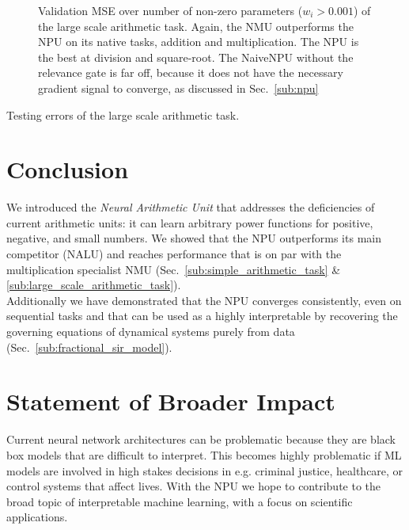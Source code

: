 \documentclass[9pt]{article}
\begin{document}
\begin{figure}
  \centering
  \resizebox{\textwidth}{!}{}
  \caption{Validation MSE over number of non-zero parameters ($w_i > 0.001$) of the large scale
  arithmetic task.  Again, the NMU outperforms the NPU on its
  native tasks, addition and multiplication. The NPU is the best at division
  and square-root.  The NaiveNPU without the relevance gate is far off, because
  it does not have the necessary gradient signal to converge, as discussed in
  Sec.~\ref{sub:npu}}%
  \label{fig:pareto}
\end{figure}

\begin{table}
  \centering
  \caption{Testing errors of the large scale arithmetic task.}
  \label{tab:arithmetic100_val}
  
\end{table}

 
\section{Conclusion}%
\label{sec:conclusion}

We introduced the \emph{Neural Arithmetic Unit} that addresses the deficiencies
of current arithmetic units: it can learn arbitrary power functions for
positive, negative, and small numbers. We showed that the NPU outperforms its
main competitor (NALU) and reaches performance that is on par with the
multiplication specialist NMU (Sec.~\ref{sub:simple_arithmetic_task} \&
\ref{sub:large_scale_arithmetic_task}).\\
Additionally we have demonstrated that the NPU converges consistently, even on
sequential tasks and that can be used as a highly interpretable by recovering
the  governing equations of dynamical systems purely from data
(Sec.~\ref{sub:fractional_sir_model}).

\section{Statement of Broader Impact}%
\label{sec:statement_of_broader_impact}

Current neural network architectures can be problematic because they are black
box models that are difficult to interpret. This becomes highly problematic if
ML models are involved in high stakes decisions in e.g. criminal justice,
healthcare, or control systems that affect lives.  With the NPU we hope to
contribute to the broad topic of interpretable machine learning, with a focus
on scientific applications.
\end{document}
